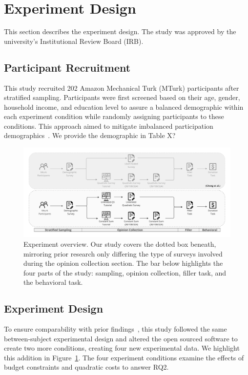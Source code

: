 \section{Experiment Design}
\label{sec:experiment}

This section describes the experiment design. The study was approved by the university's Institutional Review Board (IRB). 

\subsection{Participant Recruitment}
This study recruited 202 Amazon Mechanical Turk (MTurk) participants after stratified sampling. Participants were first screened based on their age, gender, household income, and education level to assure a balanced demographic within each experiment condition while randomly assigning participants to these conditions. This approach aimed to mitigate imbalanced participation demographics~\cite{mturk_8}. We provide the demographic in Table X?

\begin{figure}[t]
    \centering
    \includegraphics[width=\textwidth]{content/image/whyqs_exp_flow.pdf}
    \caption{Experiment overview. Our study covers the dotted box beneath, mirroring prior research only differing the type of surveys involved during the opinion collection section. The bar below highlights the four parts of the study: sampling, opinion collection, filler task, and the behavioral task.}
    \label{fig:experiment}
\end{figure}

\subsection{Experiment Design}
To ensure comparability with prior findings~\cite{chengCanShowWhat2021}, this study followed the same between-subject experimental design and altered the open sourced software to create two more conditions, creating four new experimental data. We highlight this addition in Figure~\ref{fig:experiment}. The four experiment conditions examine the effects of budget constraints and quadratic costs to answer RQ2. 

